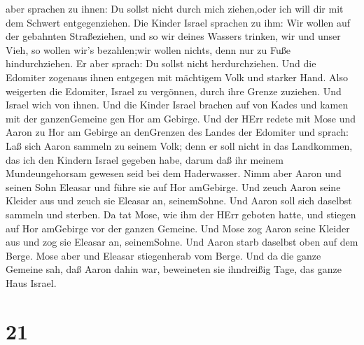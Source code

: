 aber sprachen zu ihnen: Du sollst nicht durch mich ziehen,oder ich will
dir mit dem Schwert entgegenziehen.  Die Kinder Israel
sprachen zu ihm: Wir wollen auf der gebahnten Straßeziehen, und so wir
deines Wassers trinken, wir und unser Vieh, so wollen wir's bezahlen;wir
wollen nichts, denn nur zu Fuße hindurchziehen.  Er aber
sprach: Du sollst nicht herdurchziehen. Und die Edomiter zogenaus ihnen
entgegen mit mächtigem Volk und starker Hand.  Also
weigerten die Edomiter, Israel zu vergönnen, durch ihre Grenze zuziehen.
Und Israel wich von ihnen.  Und die Kinder Israel brachen
auf von Kades und kamen mit der ganzenGemeine gen Hor am Gebirge.
 Und der HErr redete mit Mose und Aaron zu Hor am Gebirge
an denGrenzen des Landes der Edomiter und sprach:  Laß sich
Aaron sammeln zu seinem Volk; denn er soll nicht in das Landkommen, das
ich den Kindern Israel gegeben habe, darum daß ihr meinem
Mundeungehorsam gewesen seid bei dem Haderwasser.  Nimm
aber Aaron und seinen Sohn Eleasar und führe sie auf Hor amGebirge.
 Und zeuch Aaron seine Kleider aus und zeuch sie Eleasar
an, seinemSohne. Und Aaron soll sich daselbst sammeln und sterben.
 Da tat Mose, wie ihm der HErr geboten hatte, und stiegen
auf Hor amGebirge vor der ganzen Gemeine.  Und Mose zog
Aaron seine Kleider aus und zog sie Eleasar an, seinemSohne. Und Aaron
starb daselbst oben auf dem Berge. Mose aber und Eleasar stiegenherab
vom Berge.  Und da die ganze Gemeine sah, daß Aaron dahin
war, beweineten sie ihndreißig Tage, das ganze Haus Israel.

\hypertarget{section-20}{%
\section{21}\label{section-20}}

